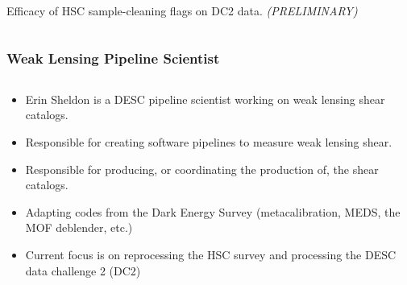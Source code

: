 \documentclass[aspectratio=169]{beamer}
\begin{document}
\begin{frame}
\begin{columns}
\begin{column}{3.5cm}
      \begin{center}
\scriptsize
Efficacy of HSC sample-cleaning flags on DC2 data. \textit{(PRELIMINARY)}
      \end{center}
      \end{column}



  \end{columns}



\end{frame}


\frame
{

    \frametitle{Weak Lensing Pipeline Scientist}

    \begin{columns}
        \begin{column}{0.7\textwidth}


            \begin{itemize}

                \item Erin Sheldon is a DESC 
                    pipeline scientist working on weak lensing
                    shear catalogs.

                \item Responsible for creating software 
                    pipelines to measure weak lensing shear.

                \item Responsible for producing, or coordinating
                    the production of, the shear catalogs.

                \item Adapting codes from the Dark
                    Energy Survey (metacalibration, MEDS,
                    the MOF deblender, etc.)

                \item Current focus is on reprocessing the HSC survey
                    and processing the DESC data challenge 2 (DC2)

            \end{itemize}


        \end{column}


\end{columns}}
\end{document}
